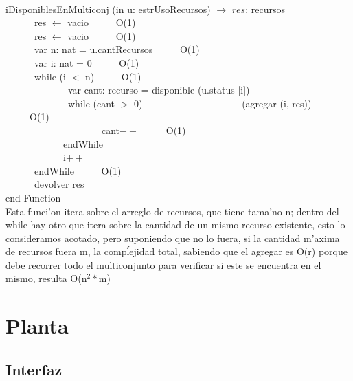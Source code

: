 \documentclass[a4paper,10pt]{article}
\begin{document}
\begin{algoritmo}
\caption{}\\
iDisponiblesEnMulticonj (in u: estrUsoRecursos) $\rightarrow$ $res$: recursos \\
	\indent \ \ \ \ \ \  res $\gets$ vacio  \ \ \ \ \ O(1)\\
	\indent \ \ \ \ \ \  res $\gets$ vacio  \ \ \ \ \ O(1)\\
	\indent \ \ \ \ \ \  var n: nat = u.cantRecursos  \ \ \ \ \ O(1)\\
	\indent \ \ \ \ \ \  var i: nat = 0  \ \ \ \ \ O(1)\\  
	\indent \ \ \ \ \ \  while (i $<$ n)  \ \ \ \ \ O(1)\\
	\indent \ \ \ \ \ \ \ \ \ \ \ \ \ var cant: recurso = disponible (u.status [i]) \\	
	\indent \ \ \ \ \ \ \ \ \ \ \ \ \ while (cant $>$ 0)
	\indent \ \ \ \ \ \ \ \ \ \ \ \ \ \ \ \ \ \ \ \ (agregar (i, res)) \ \ \ \ \ O(1) \\
	\indent \ \ \ \ \ \ \ \ \ \ \ \ \ \ \ \ \ \ \ \ cant$--$ \ \ \ \ \ O(1) \\
	\indent \ \ \ \ \ \ \ \ \ \ \ \ endWhile \ \ \ \ \ \\
	\indent \ \ \ \ \ \ \ \ \ \ \ \ i$++$ \ \ \ \ \ \\
	\indent \ \ \ \ \ \  endWhile \ \ \ \ \ O(1)\\ 
	\indent \ \ \ \ \ \  devolver res    \\
   end Function \\

Esta funci'on itera sobre el arreglo de recursos, que tiene tama'no n; dentro del while hay otro que itera sobre la cantidad de un mismo recurso existente, esto lo consideramos acotado, pero suponiendo que no lo fuera, si la cantidad m'axima de recursos fuera m, la compĺejidad total, sabiendo que el agregar es O(r) porque debe recorrer todo el multiconjunto para verificar si este se encuentra en el mismo, resulta O(n$^{2}*$m)
\end{algoritmo}


\newpage

\section{Planta}

\subsection{Interfaz}
\end{document}
